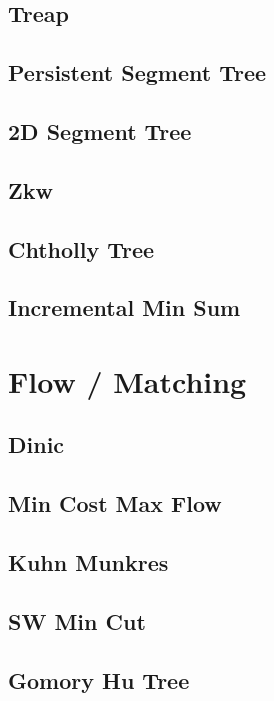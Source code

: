\subsection{Treap}

\subsection{Persistent Segment Tree}

\subsection{2D Segment Tree}

\subsection{Zkw}

\subsection{Chtholly Tree}

\subsection{Incremental Min Sum}


\section{Flow / Matching}
\subsection{Dinic}

\subsection{Min Cost Max Flow}

\subsection{Kuhn Munkres}

\subsection{SW Min Cut}

\subsection{Gomory Hu Tree}

